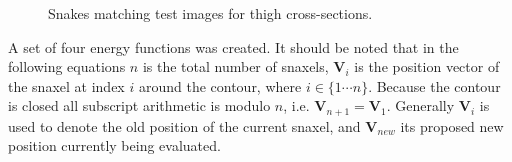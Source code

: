 \begin{figure}[tb]
	\vspace{-10pt}
	\centering
	\quad
	\caption{Snakes matching test images for thigh cross-sections.}
	\label{Contours}
\end{figure}

\bigskip
\noindent A set of four energy functions was created.  It should be noted that in the following equations $n$ is the total number of snaxels,
$\mathbf{V}_{i}$ is the position vector of the snaxel at index $i$ around the contour, where $i \in \{1 \cdots n\}$.
Because the contour is closed all subscript arithmetic is modulo $n$, i.e. $\mathbf{V}_{n+1} = \mathbf{V}_{1}$.
Generally $\mathbf{V}_{i}$ is used to denote the old position of the current snaxel, and $\mathbf{V}_{new}$ its proposed new position
currently being evaluated.


